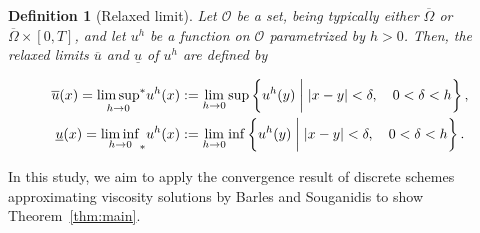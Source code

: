 \documentclass[11pt]{article}
\numberwithin{equation}{section}
\newtheorem{defn}[theorem]{Definition}
\newcommand{\closure}[1]{\overline{#1}}
\begin{document}
\begin{defn}[Relaxed limit]
    \label{defn:relax-limit}
    Let $\mathcal O$ be a set, being typically either $\closure{\Omega}$ or $\closure{\Omega}\times[0,T]$,
    and let $u^h$ be a function on $\mathcal O$ parametrized by $h>0$.
    Then, the relaxed limits $\overline u$ and $\underline{u}$ of $u^h$ are defined by

    \begin{equation*}
        \begin{aligned}
        \overline{u}(x) = {{\limsup_{h\to 0}}^*}u^h(x) &:= \lim_{h\to 0}\sup\left\{u^h(y)\biggm| |x-y| < \delta,\quad 0<\delta<h\right\},\\
        \underline{u}(x) = {{\liminf_{h\to 0}}_*}u^h(x) &:= \lim_{h\to 0}\inf\left\{u^h(y)\biggm| |x-y| < \delta,\quad 0<\delta<h\right\}.
        \end{aligned}
    \end{equation*}
\end{defn}

In this study, we aim to apply the convergence result of discrete schemes approximating viscosity solutions by Barles and Souganidis \cite[Theorem 2.1]{BS91} to show Theorem~\ref{thm:main}. 
\end{document}
